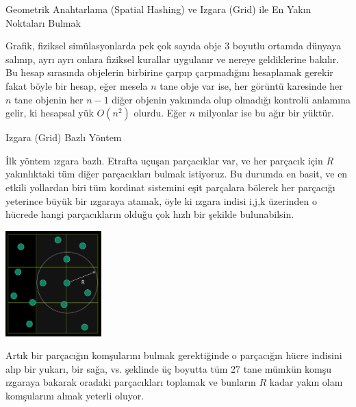 \documentclass[12pt,fleqn]{article}\usepackage{../../common}
\begin{document}
Geometrik Anahtarlama (Spatial Hashing) ve Izgara (Grid) ile En Yakın Noktaları Bulmak

Grafik, fiziksel simülasyonlarda pek çok sayıda obje 3 boyutlu ortamda dünyaya
salınıp, ayrı ayrı onlara fiziksel kurallar uygulanır ve nereye geldiklerine
bakılır. Bu hesap sırasında objelerin birbirine çarpıp çarpmadığını hesaplamak
gerekir fakat böyle bir hesap, eğer mesela $n$ tane obje var ise, her görüntü
karesinde her $n$ tane objenin her $n-1$ diğer objenin yakınında olup olmadığı
kontrolü anlamına gelir, ki hesapsal yük $O(n^2)$ olurdu. Eğer $n$ milyonlar ise
bu ağır bir yüktür.

Izgara (Grid) Bazlı Yöntem

İlk yöntem ızgara bazlı. Etrafta uçuşan parçacıklar var, ve her parçacık için
$R$ yakınlıktaki tüm diğer parçacıkları bulmak istiyoruz. Bu durumda en basit,
ve en etkili yollardan biri tüm kordinat sistemini eşit parçalara bölerek her
parçacığı yeterince büyük bir ızgaraya atamak, öyle ki ızgara indisi i,j,k
üzerinden o hücrede hangi parçacıkların olduğu çok hızlı bir şekilde
bulunabilsin.  

\includegraphics[width=10em]{algs_073_hash_03.png}

Artık bir parçacığın komşularını bulmak gerektiğinde o parçacığın hücre indisini
alıp bir yukarı, bir sağa, vs. şeklinde üç boyutta tüm 27 tane mümkün komşu
ızgaraya bakarak oradaki parçacıkları toplamak ve bunların $R$ kadar yakın olanı
komşularını almak yeterli oluyor.
\end{document}
